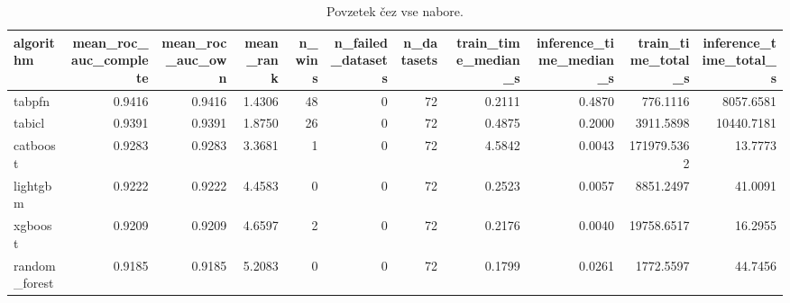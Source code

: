 \begin{table}[htbp]
\centering
\caption{Povzetek čez vse nabore.}
\label{tab:overall}
\begin{tabular}{lrrrrrrrrrr}
\hline
algorithm & mean\_roc\_auc\_complete & mean\_roc\_auc\_own & mean\_rank & n\_wins & n\_failed\_datasets & n\_datasets & train\_time\_median\_s & inference\_time\_median\_s & train\_time\_total\_s & inference\_time\_total\_s \\
\hline
tabpfn & 0.9416 & 0.9416 & 1.4306 & 48 & 0 & 72 & 0.2111 & 0.4870 & 776.1116 & 8057.6581 \\
tabicl & 0.9391 & 0.9391 & 1.8750 & 26 & 0 & 72 & 0.4875 & 0.2000 & 3911.5898 & 10440.7181 \\
catboost & 0.9283 & 0.9283 & 3.3681 & 1 & 0 & 72 & 4.5842 & 0.0043 & 171979.5362 & 13.7773 \\
lightgbm & 0.9222 & 0.9222 & 4.4583 & 0 & 0 & 72 & 0.2523 & 0.0057 & 8851.2497 & 41.0091 \\
xgboost & 0.9209 & 0.9209 & 4.6597 & 2 & 0 & 72 & 0.2176 & 0.0040 & 19758.6517 & 16.2955 \\
random\_forest & 0.9185 & 0.9185 & 5.2083 & 0 & 0 & 72 & 0.1799 & 0.0261 & 1772.5597 & 44.7456 \\
\hline
\end{tabular}
\end{table}
